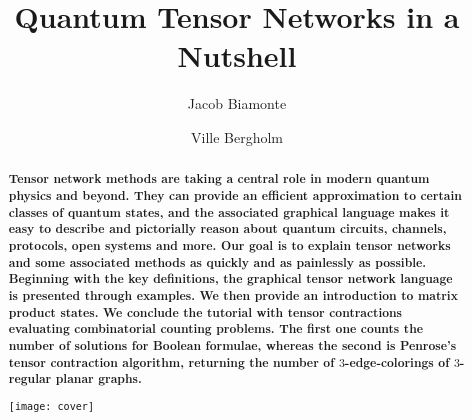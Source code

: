 \documentclass[aps,pra,12pt,nofootinbib,superscriptaddress,longbibliography]{revtex4-1}
\theoremstyle{plain}
\theoremstyle{definition}
\begin{document}
\newlength{\diagwidth}
\setlength{\diagwidth}{10cm }

\title{Quantum Tensor Networks in a Nutshell}

\author{Jacob Biamonte}

\author{Ville Bergholm}




\begin{abstract}
{\bf
Tensor network methods are taking a central role in modern quantum physics and beyond. They can provide an efficient approximation to certain classes of quantum states,
and the associated graphical language makes it easy to describe and pictorially reason about quantum circuits, channels, protocols, open systems and more. Our goal is to explain tensor networks and some associated methods as quickly and as painlessly as possible. Beginning with the key definitions, the graphical tensor network language is presented through examples. We then provide an introduction to matrix product states.  
We conclude the tutorial with tensor contractions evaluating combinatorial counting problems.  The first one counts the number of solutions for Boolean formulae, whereas the second is Penrose's tensor contraction algorithm, returning the number of
$3$-edge-colorings of $3$-regular planar graphs.
}

\begin{center}
  \texttt{[image: cover]}  
\end{center}
\end{abstract}



\maketitle
\end{document}
